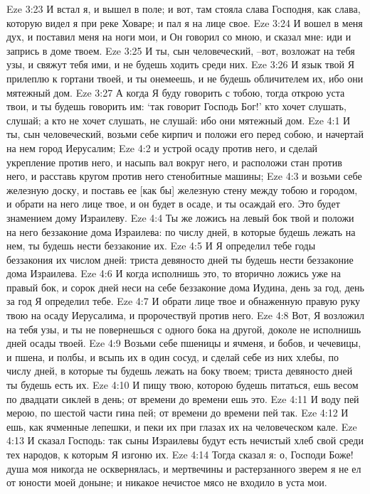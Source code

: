 Eze 3:23  И встал я, и вышел в поле; и вот, там стояла слава Господня, как слава, которую видел я при реке Ховаре; и пал я на лице свое.
Eze 3:24  И вошел в меня дух, и поставил меня на ноги мои, и Он говорил со мною, и сказал мне: иди и запрись в доме твоем.
Eze 3:25  И ты, сын человеческий, --вот, возложат на тебя узы, и свяжут тебя ими, и не будешь ходить среди них.
Eze 3:26  И язык твой Я прилеплю к гортани твоей, и ты онемеешь, и не будешь обличителем их, ибо они мятежный дом.
Eze 3:27  А когда Я буду говорить с тобою, тогда открою уста твои, и ты будешь говорить им: `так говорит Господь Бог!' кто хочет слушать, слушай; а кто не хочет слушать, не слушай: ибо они мятежный дом.
Eze 4:1  И ты, сын человеческий, возьми себе кирпич и положи его перед собою, и начертай на нем город Иерусалим;
Eze 4:2  и устрой осаду против него, и сделай укрепление против него, и насыпь вал вокруг него, и расположи стан против него, и расставь кругом против него стенобитные машины;
Eze 4:3  и возьми себе железную доску, и поставь ее [как бы] железную стену между тобою и городом, и обрати на него лице твое, и он будет в осаде, и ты осаждай его. Это будет знамением дому Израилеву.
Eze 4:4  Ты же ложись на левый бок твой и положи на него беззаконие дома Израилева: по числу дней, в которые будешь лежать на нем, ты будешь нести беззаконие их.
Eze 4:5  И Я определил тебе годы беззакония их числом дней: триста девяносто дней ты будешь нести беззаконие дома Израилева.
Eze 4:6  И когда исполнишь это, то вторично ложись уже на правый бок, и сорок дней неси на себе беззаконие дома Иудина, день за год, день за год Я определил тебе.
Eze 4:7  И обрати лице твое и обнаженную правую руку твою на осаду Иерусалима, и пророчествуй против него.
Eze 4:8  Вот, Я возложил на тебя узы, и ты не повернешься с одного бока на другой, доколе не исполнишь дней осады твоей.
Eze 4:9  Возьми себе пшеницы и ячменя, и бобов, и чечевицы, и пшена, и полбы, и всыпь их в один сосуд, и сделай себе из них хлебы, по числу дней, в которые ты будешь лежать на боку твоем; триста девяносто дней ты будешь есть их.
Eze 4:10  И пищу твою, которою будешь питаться, ешь весом по двадцати сиклей в день; от времени до времени ешь это.
Eze 4:11  И воду пей мерою, по шестой части гина пей; от времени до времени пей так.
Eze 4:12  И ешь, как ячменные лепешки, и пеки их при глазах их на человеческом кале.
Eze 4:13  И сказал Господь: так сыны Израилевы будут есть нечистый хлеб свой среди тех народов, к которым Я изгоню их.
Eze 4:14  Тогда сказал я: о, Господи Боже! душа моя никогда не осквернялась, и мертвечины и растерзанного зверем я не ел от юности моей доныне; и никакое нечистое мясо не входило в уста мои.

